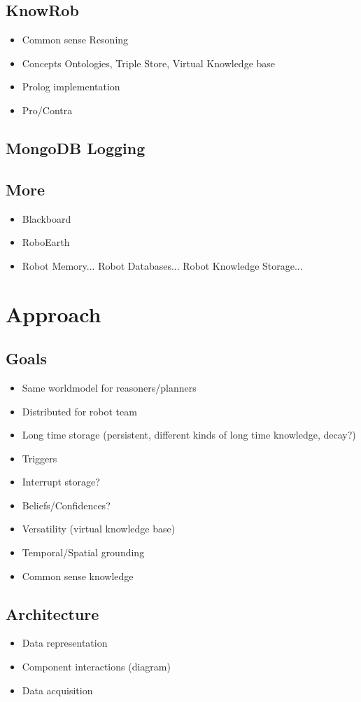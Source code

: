 \documentclass[a4paper,11pt]{article}
\begin{document}
\subsection{KnowRob}
\label{sec:knowrob}
\begin{itemize}
\item Common sense Resoning
\item Concepts Ontologies, Triple Store, Virtual Knowledge base
\item Prolog implementation
\item Pro/Contra
\end{itemize}
\subsection{MongoDB Logging}
\label{sec:mongo-logging}
\subsection{More}
\begin{itemize}
\item Blackboard
\item RoboEarth
\item Robot Memory... Robot Databases... Robot Knowledge Storage...
\end{itemize}


\section{Approach}
\label{sec:approach}
\subsection{Goals}
\label{sec:goals}
\begin{itemize}
\item Same worldmodel for reasoners/planners
\item Distributed for robot team
\item Long time storage (persistent, different kinds of long time knowledge, decay?)
\item Triggers
\item Interrupt storage?
\item Beliefs/Confidences?
\item Versatility (virtual knowledge base)
\item Temporal/Spatial grounding
\item Common sense knowledge
\end{itemize}
\subsection{Architecture}
\label{sec:arch}
\begin{itemize}
\item Data representation
\item Component interactions (diagram)
\item Data acquisition
\end{itemize}
\end{document}
